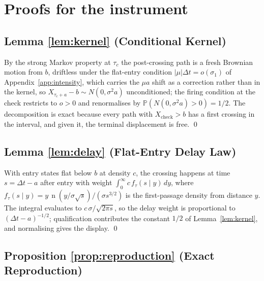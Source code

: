 \documentclass[11pt,a4paper]{article}
\theoremstyle{definition}
\theoremstyle{plain}
\theoremstyle{remark}
\DeclareMathOperator{\nden}{n}
\begin{document}
\section{Proofs for the instrument}\label{app:proofs}

\subsection{Lemma \ref{lem:kernel} (Conditional Kernel)}

By the strong Markov property at $\tau_c$ the post-crossing path is a fresh Brownian motion from $b$, driftless under the flat-entry condition $|\mu| \Delta t = o(\sigma_1)$ of
Appendix~\ref{app:intensity}, which carries the $\mu a$ shift as a correction rather than in the kernel, so $X_{\tau_c + a} - b
\sim N(0, \sigma^2 a)$ unconditioned; the firing condition at the check restricts to $o > 0$ and renormalises by $\mathbb{P}(N(0,
\sigma^2 a) > 0) = 1/2$. The decomposition is exact because every path with $X_{\mathrm{check}} > b$ has a first crossing in the interval, and given it, the terminal displacement is free. \qed

\subsection{Lemma \ref{lem:delay} (Flat-Entry Delay Law)}

With entry states flat below $b$ at density $c$, the crossing happens at time $s = \Delta t - a$ after entry with weight $\int_0^\infty c\, f_\tau(s \mid y)\, dy$, where $f_\tau(s \mid y) =
y\, \nden(y/\sigma\sqrt{s})/(\sigma s^{3/2})$ is the first-passage density from distance $y$. The integral evaluates to $c\,\sigma/\sqrt{2\pi s}$, so the delay weight is proportional to
$(\Delta t - a)^{-1/2}$; qualification contributes the constant $1/2$ of Lemma~\ref{lem:kernel}, and normalising gives the display.
\qed

\subsection{Proposition \ref{prop:reproduction} (Exact Reproduction)}
\end{document}
